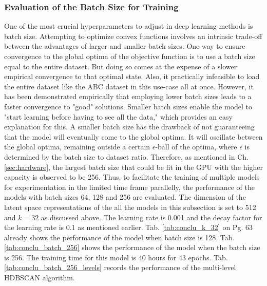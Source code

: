 \subsubsection{Evaluation of the Batch Size for Training}
One of the most crucial hyperparameters to adjust in deep learning methods is batch size. Attempting to optimize convex functions involves an intrinsic trade-off between the advantages of larger and smaller batch sizes. One way to ensure convergence to the global optima of the objective function is to use a batch size equal to the entire dataset. But doing so comes at the expense of a slower empirical convergence to that optimal state. Also, it practically infeasible to load the entire dataset like the ABC dataset \cite{Koch_2019_CVPR} in this use-case all at once. However, it has been demonstrated empirically that employing lower batch sizes leads to a faster convergence to "good" solutions. Smaller batch sizes enable the model to "start learning before having to see all the data," which provides an easy explanation for this. A smaller batch size has the drawback of not guaranteeing that the model will eventually come to the global optima. It will oscillate between the global optima, remaining outside a certain $\epsilon$-ball of the optima, where $\epsilon$ is determined by the batch size to dataset ratio. Therefore, as mentioned in Ch. \ref{sec:hardware}, the largest batch size that could be fit in the GPU with the higher capacity is observed to be 256. Thus, to facilitate the training of multiple models for experimentation in the limited time frame parallelly, the performance of the models with batch sizes 64, 128 and 256 are evaluated. The dimension of the latent space representations of the all the models in this subsection is set to 512 and $k=32$ as discussed above. The learning rate is 0.001 and the decay factor for the learning rate is 0.1 as mentioned earlier. Tab. \ref{tab:conclu_k_32} on Pg. 63 already shows the performance of the model when batch size is 128. Tab. \ref{tab:conclu_batch_256} shows the performance of the model when the batch size is 256. The training time for this model is 40 hours for 43 epochs. Tab. \ref{tab:conclu_batch_256_levels} records the performance of the multi-level \ac{HDBSCAN} algorithm.
